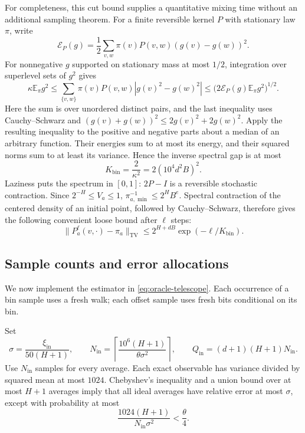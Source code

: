 For completeness, this cut bound supplies a quantitative mixing time
without an additional sampling theorem.  For a finite reversible kernel
$P$ with stationary law $\pi$, write
\[
 \mathcal E_P(g)=\frac12\sum_{v,w}\pi(v)P(v,w)(g(v)-g(w))^2.
\]
For nonnegative $g$ supported on stationary mass at most $1/2$,
integration over superlevel sets of $g^2$ gives
\[
 \kappa\mathbb E_\pi g^2
 \le\sum_{\{v,w\}}\pi(v)P(v,w)|g(v)^2-g(w)^2|
 \le\bigl(2\mathcal E_P(g)\mathbb E_\pi g^2\bigr)^{1/2}.
\]
Here the sum is over unordered distinct pairs, and the last inequality
uses Cauchy--Schwarz and
$(g(v)+g(w))^2\le2g(v)^2+2g(w)^2$.
Apply the resulting inequality to the positive and negative parts about
a median of an arbitrary function.  Their energies sum to at most its
energy, and their squared norms sum to at least its variance.  Hence
the inverse spectral gap is at most
\[
 K_{\mathrm{bin}}=\frac{2}{\kappa^2}
                  =2(10^4d^2B)^2.
\]
Laziness puts the spectrum in $[0,1]$: $2P-I$ is a reversible stochastic
contraction.  Since $2^{-H}\le V_a\le1$,
$\pi_{a,\min}^{-1}\le2^HB^e$.  Spectral contraction of the centered
density of an initial point, followed by Cauchy--Schwarz, therefore
gives the following convenient loose bound after $\ell$ steps:
\begin{equation}
 \|P_a^\ell(v,\cdot)-\pi_a\|_{\mathrm{TV}}
 \le 2^{H+dB}\exp(-\ell/K_{\mathrm{bin}}).
 \label{eq:bin-mixing}
\end{equation}

\subsection{Sample counts and error allocations}

We now implement the estimator in \eqref{eq:oracle-telescope}.
Each occurrence of a bin sample uses a fresh walk; each offset sample
uses fresh bits conditional on its bin.

Set
\begin{equation}
 \sigma=\frac{\xi_{\mathrm{in}}}{50(H+1)},\qquad
 N_{\mathrm{in}}=
 \left\lceil\frac{10^6(H+1)}{\theta\sigma^2}\right\rceil,
 \qquad Q_{\mathrm{in}}=(d+1)(H+1)N_{\mathrm{in}}.
 \label{eq:inner-parameters}
\end{equation}
Use $N_{\mathrm{in}}$ samples for every average.  Each exact observable
has variance divided by squared mean at most $1024$.  Chebyshev's
inequality and a union bound over at most $H+1$ averages imply that
all ideal averages have relative error at most $\sigma$, except with
probability at most
\[
 \frac{1024(H+1)}{N_{\mathrm{in}}\sigma^2}<\frac\theta4.
\]

